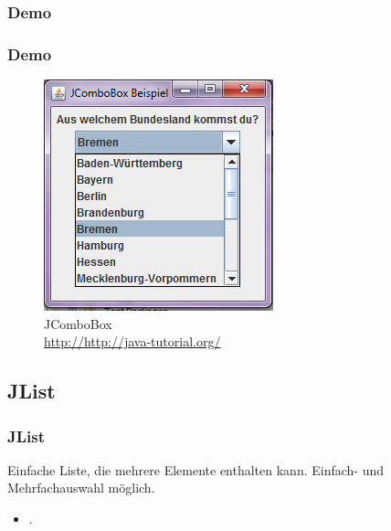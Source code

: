 \documentclass[xcolor=dvipsnames]{beamer}
\begin{document}
\subsubsection{Demo}
\begin{frame}
  \frametitle{Demo}
	\begin{figure}
		\includegraphics[scale=0.8]{images/jcombobox.PNG}
		\caption{JComboBox \\ \tiny{\textcolor{gray}{\url{http://http://java-tutorial.org/}}}}
		\end{figure}
\end{frame}


\subsection{JList}
\begin{frame} %
  \frametitle{JList} %
  \begin{block}{Einfache Liste, die mehrere Elemente enthalten kann. Einfach- und Mehrfachauswahl möglich.}
	  \begin{itemize}
		\item .
	  \end{itemize}
  \end{block}
\end{frame}
\end{document}
